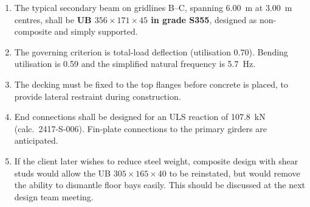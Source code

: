 \documentclass[11pt,a4paper]{article}
\begin{document}
\begin{enumerate}
  \item The typical secondary beam on gridlines B--C, spanning \qty{6.00}{\metre} at \qty{3.00}{\metre} centres, shall be \textbf{UB $356\times171\times45$ in grade S355}, designed as non-composite and simply supported.
  \item The governing criterion is total-load deflection (utilisation 0.70). Bending utilisation is 0.59 and the simplified natural frequency is \qty{5.7}{\hertz}.
  \item The decking must be fixed to the top flanges before concrete is placed, to provide lateral restraint during construction.
  \item End connections shall be designed for an ULS reaction of \qty{107.8}{\kN} (calc.\ 2417-S-006). Fin-plate connections to the primary girders are anticipated.
  \item If the client later wishes to reduce steel weight, composite design with shear studs would allow the UB $305\times165\times40$ to be reinstated, but would remove the ability to dismantle floor bays easily. This should be discussed at the next design team meeting.
\end{enumerate}
\end{document}
